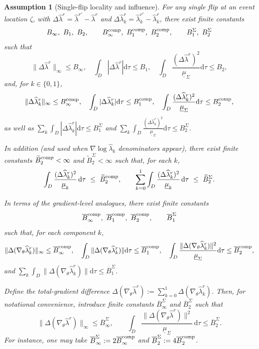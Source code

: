 \documentclass{statsoc}
\newtheorem{assumption}[assumption]{Assumption}
\newcommand{\dd}{\mathrm{d}}
\newcommand{\1}{\mathbbm{1}}
\begin{document}
\begin{assumption}[Single-flip locality and influence]\label{ass:G3}
For any single flip at an event location $\zeta$, with $\Delta\widehat\lambda^r=\widehat\lambda^{r'}-\widehat\lambda^{r}$ and $\Delta\widehat\lambda_{k}^r=\widehat\lambda_{k}^{r'}-\widehat\lambda_{k}^{r}$, there exist finite constants
\[
B_\infty,\ B_1,\ B_2,\qquad B_\infty^{\rm comp},\ B_1^{\rm comp},\ B_2^{\rm comp},\qquad B_1^\Sigma,\ B_2^\Sigma
\]
such that
\[
\|\Delta\widehat\lambda^r\|_\infty\le B_\infty,\quad \int_D |\Delta\widehat\lambda^r| \dd\tau\le B_1,\quad \int_D \frac{(\Delta\widehat\lambda^r)^2}{\underline\mu_\Sigma} \dd\tau\le B_2,
\]
and, for $k\in\{0,1\}$,
\[
\|\Delta\widehat\lambda_k^r\|_\infty\le B_\infty^{\rm comp},\quad \int_D |\Delta\widehat\lambda_k^r| \dd\tau\le B_1^{\rm comp},\quad \int_D \frac{(\Delta\widehat\lambda_k^r)^2}{\underline\mu_\Sigma} \dd\tau\le B_2^{\rm comp},
\]
as well as $\sum_k \int_D |\Delta\widehat\lambda_k^r| \dd\tau \le B_1^\Sigma$ and $\sum_k \int_D \frac{(\Delta\widehat\lambda_k^r)^2}{\underline\mu_\Sigma} \dd\tau \le B_2^\Sigma$.

In addition (and used when $\nabla\log\widehat\lambda_k$ denominators appear), there exist finite constants $\widetilde B_2^{\rm comp}<\infty$ and $\widetilde B_2^\Sigma<\infty$ such that, for each $k$,
\[
\int_D \frac{(\Delta\widehat\lambda_k^r)^2}{\underline\mu_k}\,\dd\tau \ \le\ \widetilde B_2^{\rm comp},
\qquad
\sum_{k=0}^1 \int_D \frac{(\Delta\widehat\lambda_k^r)^2}{\underline\mu_k}\,\dd\tau \ \le\ \widetilde B_2^\Sigma.
\]

In terms of the gradient-level analogues, there exist finite constants
\[
\overline B_\infty^{\rm comp},\ \overline B_1^{\rm comp},\ \overline B_2^{\rm comp},\qquad \overline B_1^\Sigma
\]
such that, for each component $k$,
\[
\|\Delta(\nabla_\theta \widehat\lambda_k^r)\|_\infty\le \overline B_\infty^{\rm comp},\quad
\int_D \|\Delta(\nabla_\theta \widehat\lambda_k^r)\| \dd\tau\le \overline B_1^{\rm comp},\quad
\int_D \frac{\|\Delta(\nabla_\theta \widehat\lambda_k^r)\|^2}{\underline\mu_\Sigma} \dd\tau\le \overline B_2^{\rm comp},
\]
and $\sum_k\int_D \|\Delta(\nabla_\theta \widehat\lambda_k^r)\| \dd\tau\le \overline B_1^\Sigma$. 

Define the total-gradient difference $\Delta(\nabla_\theta \widehat\lambda^{r}):=\sum_{k=0}^1 \Delta(\nabla_\theta \widehat\lambda_k^{r})$. Then, for notational convenience, introduce finite constants $\overline B_\infty^\Sigma$ and $\overline B_2^\Sigma$ such that
\[
\|\Delta(\nabla_\theta \widehat\lambda^{r})\|_\infty\le \overline B_\infty^\Sigma,
\qquad
\int_D \frac{\|\Delta(\nabla_\theta \widehat\lambda^{r})\|^2}{\underline\mu_\Sigma}\,\dd\tau\le \overline B_2^\Sigma.
\]
For instance, one may take $\overline B_\infty^\Sigma:=2\overline B_\infty^{\rm comp}$ and $\overline B_2^\Sigma:=4\overline B_2^{\rm comp}$.


\end{assumption}
\end{document}
